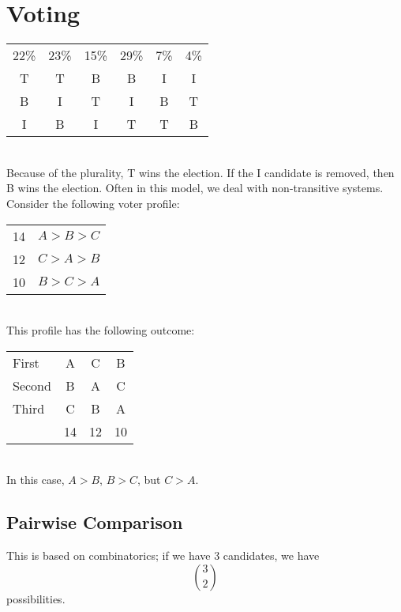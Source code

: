 \documentclass{hw}
\begin{document}
\section{Voting}
{\centering
\begin{tabular}{c c c c c c}
22\% & 23\% & 15\% & 29\% & 7\% & 4\%\\
T&T&B&B&I&I\\
B&I&T&I&B&T\\
I&B&I&T&T&B
\end{tabular}
}
\noindent\\
Because of the plurality, T wins the election. If the I candidate is removed, then B wins the election.
Often in this model, we deal with non-transitive systems. Consider the following voter profile:\\
{\centering
\begin{tabular}{c c}
14 & $A>B>C$\\
12 & $C>A>B$\\
10 & $B>C>A$
\end{tabular}
}
\noindent\\
This profile has the following outcome:\\
{\centering
\begin{tabular}{l c c c}
First & A&C&B\\
Second & B&A&C\\
Third & C&B&A\\
& 14&12&10
\end{tabular}
}
\noindent\\
In this case, $A>B$, $B>C$, but $C>A$.

\subsection{Pairwise Comparison}
This is based on combinatorics; if we have 3 candidates, we have
\[
{3 \choose 2}
\]
possibilities.
\end{document}
